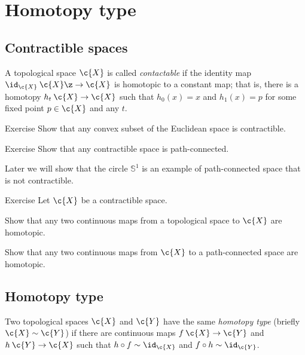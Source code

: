 \chapter{Homotopy type}

\section{Contractible spaces}

A topological space $\c{X}$ is called \emph{contactable} if the identity map $\id_\c{X}\:\c{X}\z\to \c{X}$ is homotopic to a constant map;
that is, there is a homotopy $h_t\:\c{X}\to\c{X}$ such that $h_0(x)=x$ and $h_1(x)=p$ for some fixed point $p\in\c{X}$ and any $t$.

\begin{thm}{Exercise}
Show that any convex subset of the Euclidean space is contractible.
\end{thm}


\begin{thm}{Exercise}
Show that any contractible space is path-connected.
\end{thm}

Later we will show that the circle $\mathbb{S}^1$ is an example of path-connected space that is not contractible.

\begin{thm}{Exercise}
Let $\c{X}$ be a contractible space.

\begin{subthm}{}
Show that any two continuous maps from a topological space to $\c{X}$ are homotopic.
\end{subthm}

\begin{subthm}{}
Show that any two continuous maps from $\c{X}$ to a path-connected space are homotopic.
\end{subthm}

\end{thm}

\section{Homotopy type}

Two topological spaces $\c{X}$ and $\c{Y}$ have the same \emph{homotopy type} (briefly $\c{X}\sim\c{Y}$) if there are continuous maps
$f\: \c{X}\to \c{Y}$ and $h\:\c{Y}\to \c{X}$ such that $h\circ f\sim \id_\c{X}$ and $f\circ h\sim \id_\c{Y}$.

